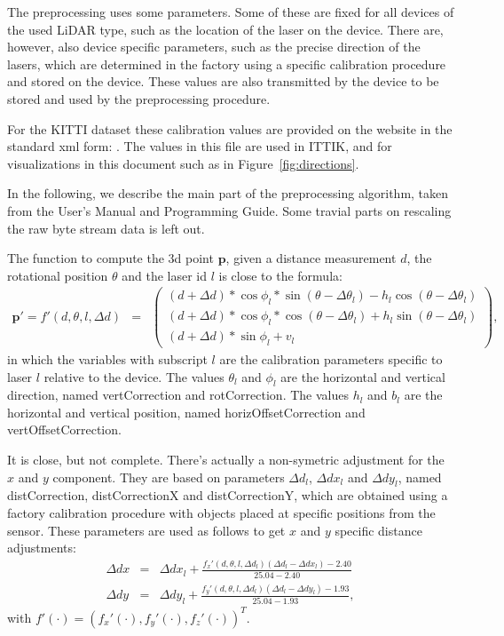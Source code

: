 \documentclass[english]{article}
\begin{document}
The preprocessing uses some parameters. Some of these are fixed for all
devices of the used LiDAR type, such as the location of the laser on the
device. There are, however, also device specific parameters, such as the
precise direction of the lasers, which are determined in the factory
using a specific calibration procedure and stored on the device. These
values are also transmitted by the device to be stored and used by the
preprocessing procedure.

For the KITTI dataset these calibration values are provided on the
website in the standard xml form:
. The values in
this file are used in ITTIK, and for visualizations in this document
such as in Figure~\ref{fig:directions}.

In the following, we describe the main part of the preprocessing
algorithm, taken from the User's Manual and Programming Guide. Some
travial parts on rescaling the raw byte stream data is left out.

The function to compute the 3d point $\mathbf{p}$, given a distance measurement $d$,
the rotational position $\theta$ and the laser id $l$ is close to
the formula:
\begin{eqnarray}
  \mathbf{p'} =
  f'(d, \theta, l, \Delta d) &=& \left(
           \begin{array}{l}
             (d + \Delta d) * \cos{\phi_l} * \sin(\theta - \Delta \theta_l) - h_l \cos(\theta - \Delta \theta_l) \\
             (d + \Delta d) * \cos{\phi_l} * \cos(\theta - \Delta \theta_l) + h_l \sin(\theta - \Delta \theta_l) \\
             (d + \Delta d) * \sin{\phi_l} + v_l
           \end{array}
         \right),
  \label{eq:ptilde}
\end{eqnarray}
in which the variables with subscript $l$ are the calibration parameters
specific to laser $l$ relative to the device. The values $\theta_l$ and
$\phi_l$ are the horizontal and vertical direction, named vertCorrection
and rotCorrection. The values $h_l$ and $b_l$ are the horizontal and
vertical position, named horizOffsetCorrection and vertOffsetCorrection.

It is close, but not complete. There's actually a non-symetric adjustment
for the $x$ and $y$ component. They are based on parameters $\Delta
d_l$, $\Delta dx_l$ and $\Delta dy_l$, named distCorrection,
distCorrectionX and distCorrectionY, which are obtained using a factory
calibration procedure with objects placed at specific positions from the
sensor.  These parameters are used as follows to get $x$ and $y$
specific distance adjustments:
\begin{eqnarray}
  \Delta dx &=& \Delta dx_l + \frac{f_x'(d, \theta, l, \Delta d_l)(\Delta d_l - \Delta dx_l) - 2.40}{25.04 - 2.40}  \label{eq:ddx} \\
  \Delta dy &=& \Delta dy_l + \frac{f_y'(d, \theta, l, \Delta d_l)(\Delta d_l - \Delta dy_l) - 1.93}{25.04 - 1.93}, \label{eq:ddy}
\end{eqnarray}
with $f'(\cdot) = \left(f_x'(\cdot) , f_y'(\cdot) , f_z'(\cdot) \right)^T$.
\end{document}
